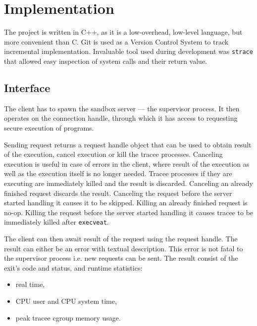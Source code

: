 \documentclass[en]{pracamgr}
\begin{document}
\chapter{Implementation}\label{chapter:implementation}

The project is written in C++, as it is a low-overhead, low-level language, but more convenient than C. Git is used as a Version Control System to track incremental implementation. Invaluable tool used during development was \texttt{strace} \cite{strace} that allowed easy inspection of system calls and their return value.

\section{Interface}

The client has to spawn the sandbox server --- the supervisor process. It then operates on the connection handle, through which it has access to requesting secure execution of programs.

Sending request returns a request handle object that can be used to obtain result of the execution, cancel execution or kill the tracee processes. Canceling execution is useful in case of errors in the client, where result of the execution as well as the execution itself is no longer needed. Tracee processes if they are executing are immediately killed and the result is discarded. Canceling an already finished request discards the result. Canceling the request before the server started handling it causes it to be skipped. Killing an already finished request is no-op. Killing the request before the server started handling it causes tracee to be immediately killed after \texttt{execveat}.

The client can then await result of the request using the request handle. The result can either be an error with textual description. This error is not fatal to the supervisor process i.e. new requests can be sent. The result consist of the exit's code and status, and runtime statistics:
\begin{itemize}
    \item real time,
    \item CPU user and CPU system time,
    \item peak tracee cgroup memory usage.
\end{itemize}
\end{document}
